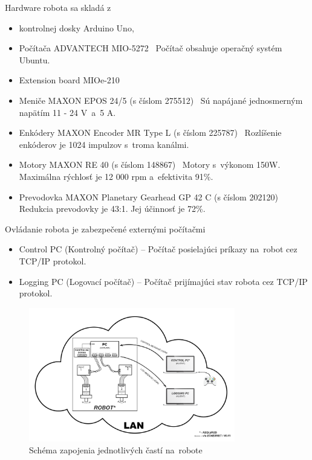 Hardware robota sa skladá z
\begin{itemize}
	\item kontrolnej dosky Arduino Uno,

	\item Počítača ADVANTECH MIO-5272~\cite{robotPc} \newline
		Počítač obsahuje operačný systém Ubuntu.

	\item Extension board MIOe-210~\cite{extensionModule}

	\item Meniče MAXON EPOS 24/5 (s číslom 275512)~\cite{menic} \newline
	 	Sú napájané jednosmerným napätím 11 - 24 V~a~5 A.

	\item Enkódery MAXON Encoder MR Type L (s číslom 225787)~\cite{encoder} \newline
		Rozlíšenie enkóderov je 1024 impulzov s~troma kanálmi.

	\item Motory MAXON RE 40 (s číslom 148867)~\cite{motor} \newline
		Motory s~výkonom 150W. Maximálna rýchlosť je 12 000 rpm a~efektivita 91\%.

	\item Prevodovka MAXON Planetary Gearhead GP 42 C (s číslom 202120)~\cite{prevodovka} \newline
		Redukcia prevodovky je 43:1. Jej účinnosť je 72\%.
\end{itemize}

\noindent Ovládanie robota je zabezpečené externými počítačmi
\begin{itemize}
	\item Control PC (Kontrolný počítač) -- Počítač posielajúci príkazy na~robot cez TCP/IP protokol.
	\item Logging PC (Logovací počítač) -- Počítač prijímajúci stav robota cez TCP/IP protokol.
\end{itemize}

\begin{figure}[!htbp]
	\begin{center}
		\includegraphics[width=9cm]{img/schemaRobota.png}
	\end{center}
	\caption{Schéma zapojenia jednotlivých častí na~robote}
	\label{fig:schemaRobota}
\end{figure}

